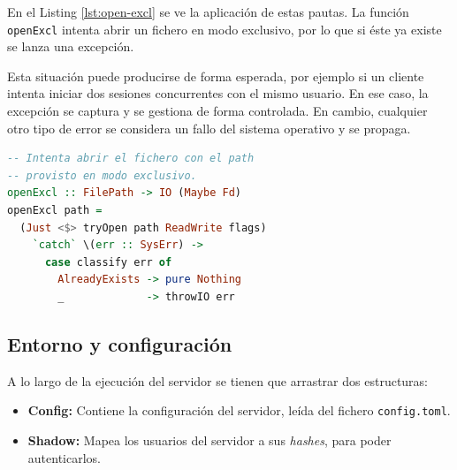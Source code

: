 \documentclass[a4paper]{CSMakotoTechnicalReport}
\begin{document}
\vspace{-4pt}
\begin{minipage}[t]{0.55\textwidth}
\vspace{0pt}
En el Listing \ref{lst:open-excl} se ve la aplicación de estas pautas. La función \texttt{openExcl} intenta abrir un fichero en modo exclusivo, por lo que si éste ya existe se lanza una excepción.

\medskip
Esta situación puede producirse de forma esperada, por ejemplo si un cliente intenta iniciar dos sesiones concurrentes con el mismo usuario. En ese caso, la excepción se captura y se gestiona de forma controlada. En cambio, cualquier otro tipo de error se considera un fallo del sistema operativo y se propaga.
\end{minipage}
\hfill
\begin{minipage}[t]{0.40\textwidth}
\vspace{0pt}
\begin{lstlisting}[language=Haskell, frame=none, numbers=none, basicstyle=\footnotesize, aboveskip=0pt]
-- Intenta abrir el fichero con el path
-- provisto en modo exclusivo.
openExcl :: FilePath -> IO (Maybe Fd)
openExcl path =
  (Just <$> tryOpen path ReadWrite flags)
    `catch` \(err :: SysErr) ->
      case classify err of
        AlreadyExists -> pure Nothing
        _             -> throwIO err
\end{lstlisting}
\vspace{-4pt}
\captionsetup{type=lstlisting}
\caption{Manejo de excepciones en openExcl.}
\label{lst:open-excl}
\end{minipage}


\subsection{Entorno y configuración}

A lo largo de la ejecución del servidor se tienen que arrastrar dos estructuras:

\begin{itemize}
    \item \textbf{Config:} Contiene la configuración del servidor, leída del fichero \texttt{config.toml}.
    \item \textbf{Shadow:} Mapea los usuarios del servidor a sus \textit{hashes}, para poder autenticarlos.
\end{itemize}
\end{document}
